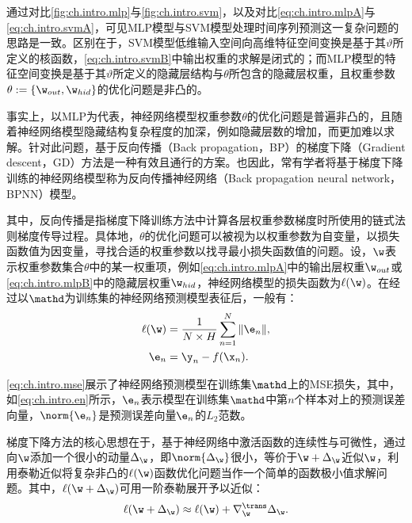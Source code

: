 通过对比\autoref{fig:ch.intro.mlp}与\autoref{fig:ch.intro.svm}，以及对比\autoref{eq:ch.intro.mlpA}与\autoref{eq:ch.intro.svmA}，可见MLP模型与SVM模型处理时间序列预测这一复杂问题的思路是一致。区别在于，SVM模型低维输入空间向高维特征空间变换是基于其\(\vartheta\)所定义的核函数，\autoref{eq:ch.intro.svmB}中输出权重的求解是闭式的；而MLP模型的特征空间变换是基于其\(\vartheta\)所定义的隐藏层结构与\(\theta\)所包含的隐藏层权重，且权重参数\(\theta:=\{\w_{out},\w_{hid}\}\)的优化问题是非凸的。

事实上，以MLP为代表，神经网络模型权重参数\(\theta\)的优化问题是普遍非凸的，且随着神经网络模型隐藏结构复杂程度的加深，例如隐藏层数的增加，而更加难以求解。针对此问题，基于反向传播（Back propagation，BP）的梯度下降（Gradient descent，GD）方法是一种有效且通行的方案。也因此，常有学者将基于梯度下降训练的神经网络模型称为反向传播神经网络（Back propagation neural network，BPNN）模型\cite{wangBack2015,wongTime1991,wangForecasting2011,dongSmall2018}。

其中，反向传播是指梯度下降训练方法中计算各层权重参数梯度时所使用的链式法则梯度传导过程。具体地，\(\theta\)的优化问题可以被视为以权重参数为自变量，以损失函数值为因变量，寻找合适的权重参数以找寻最小损失函数值的问题。设，\(\w\)表示权重参数集合\(\theta\)中的某一权重项，例如\autoref{eq:ch.intro.mlpA}中的输出层权重\(\w_{out}\)或\autoref{eq:ch.intro.mlpB}中的隐藏层权重\(\w_{hid}\)，神经网络模型的损失函数为\(\ell(\w)\)。在经过以\(\mathd\)为训练集的神经网络预测模型表征后，一般有：
\begin{align}
    \ell(\w) &= \frac{1}{N \times H} \sum^N_{n=1} \|\e_{n}\| ,\label{eq:ch.intro.mse}\\
    \e_{n} & = \y_n - f(\x_n) \label{eq:ch.intro.en}.
\end{align}

\autoref{eq:ch.intro.mse}展示了神经网络预测模型在训练集\(\mathd\)上的MSE损失，其中，如\autoref{eq:ch.intro.en}所示，\(\e_n\)表示模型在训练集\(\mathd\)中第\(n\)个样本对上的预测误差向量，\(\norm{\e_n}\)是预测误差向量\(\e_n\)的$L_2$范数。

梯度下降方法的核心思想在于，基于神经网络中激活函数的连续性与可微性，通过向\(\w\)添加一个很小的动量\(\Delta_{\w}\)，即\(\norm{\Delta_{\w}}\)很小，等价于\(\w + \Delta_{\w}\)近似\(\w\)，利用泰勒近似将复杂非凸的\(\ell(\w)\)函数优化问题当作一个简单的函数极小值求解问题。其中，\(\ell({\w + \Delta_{\w}})\)可用一阶泰勒展开予以近似：
\begin{equation}
    \ell({\w + \Delta_{\w}} ) \approx \ell({\w}) +  \nabla_{\w}^\trans \Delta_{\w}. \label{eq:ch.intro.gd}
\end{equation}

